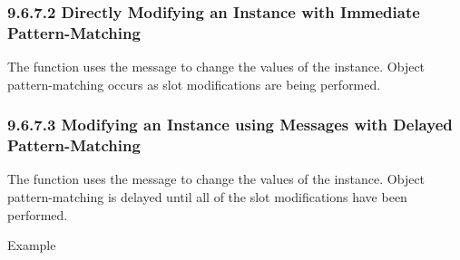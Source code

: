 \documentclass[letterpaper,10pt,english]{sphinxmanual}
\begin{document}
\subsubsection{9.6.7.2 Directly Modifying an Instance with Immediate Pattern-Matching}
\label{\detokenize{cool:directly-modifying-an-instance-with-immediate-pattern-matching}}
The  function uses the 
message to change the values of the instance. Object pattern-matching
occurs as slot modifications are being performed.


\begin{sphinxVerbatim}[commandchars=\\\{\}]
  
\end{sphinxVerbatim}


\subsubsection{9.6.7.3 Modifying an Instance using Messages with Delayed Pattern-Matching}
\label{\detokenize{cool:modifying-an-instance-using-messages-with-delayed-pattern-matching}}
The  function uses the 
message to change the values of the instance. Object pattern-matching is
delayed until all of the slot modifications have been performed.


\begin{sphinxVerbatim}[commandchars=\\\{\}]
  
\end{sphinxVerbatim}

Example
\end{document}
